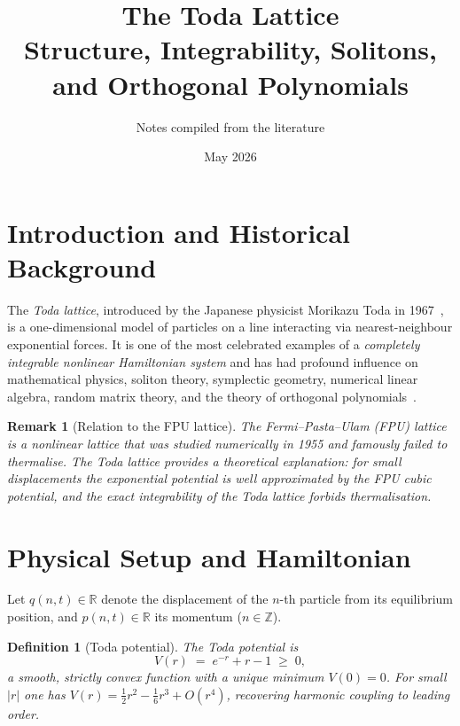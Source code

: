 \documentclass[12pt,a4paper]{article}
\title{\textbf{The Toda Lattice}\\[4pt]
       \large Structure, Integrability, Solitons, and
       Orthogonal Polynomials}
\author{Notes compiled from the literature}
\date{May 2026}
\newtheorem{definition}[theorem]{Definition}
\newtheorem{remark}[theorem]{Remark}
\theoremstyle{definition}
\newcommand{\R}{\mathbb{R}}
\newcommand{\Z}{\mathbb{Z}}
\begin{document}
\maketitle
\tableofcontents
\newpage

\section{Introduction and Historical Background}

The \emph{Toda lattice}, introduced by the Japanese physicist Morikazu Toda
in 1967~\cite{Toda1967}, is a one-dimensional model of particles on a line
interacting via nearest-neighbour exponential forces.  It is one of the most
celebrated examples of a \emph{completely integrable nonlinear Hamiltonian
system} and has had profound influence on mathematical physics, soliton
theory, symplectic geometry, numerical linear algebra, random matrix theory,
and the theory of orthogonal polynomials~\cite{Teschl2000,Toda1989}.

\begin{remark}[Relation to the FPU lattice]
The Fermi--Pasta--Ulam (FPU) lattice is a nonlinear lattice that was
studied numerically in 1955 and famously failed to thermalise.  The Toda
lattice provides a theoretical explanation: for small displacements the
exponential potential is well approximated by the FPU cubic potential, and
the \emph{exact} integrability of the Toda lattice forbids thermalisation.
\end{remark}

\section{Physical Setup and Hamiltonian}

Let $q(n,t)\in\R$ denote the displacement of the $n$-th particle from its
equilibrium position, and $p(n,t)\in\R$ its momentum ($n\in\Z$).

\begin{definition}[Toda potential]
The \emph{Toda potential} is
\begin{equation}\label{eq:potential}
  V(r) \;=\; e^{-r} + r - 1 \;\geq\; 0,
\end{equation}
a smooth, strictly convex function with a unique minimum $V(0)=0$.  For
small $|r|$ one has $V(r)=\tfrac{1}{2}r^2 - \tfrac{1}{6}r^3 + O(r^4)$,
recovering harmonic coupling to leading order.
\end{definition}
\end{document}
